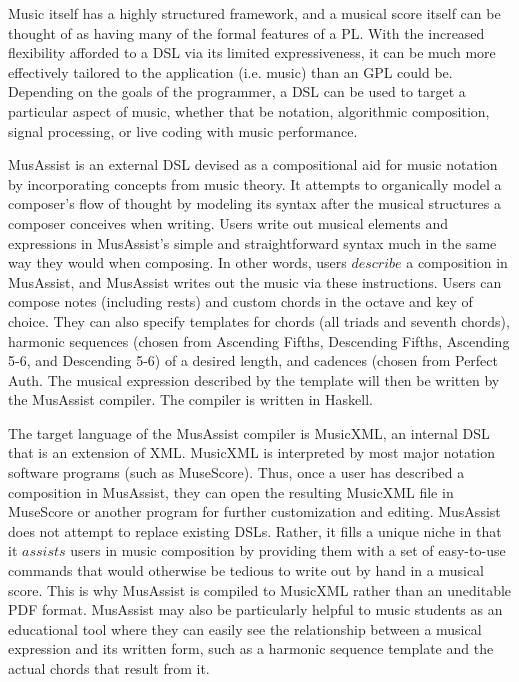 \documentclass{report}
\begin{document}
Music itself has a highly structured framework, and a musical score itself can be thought of as having many of the formal features of a PL. With the increased flexibility afforded to  a DSL via its limited expressiveness, it can be much  more effectively tailored to the application (i.e. music) than an GPL could be. Depending on the goals of the programmer, a DSL can be used to target a particular aspect of music, whether that be notation, algorithmic composition, signal processing, or live coding with music performance. 

MusAssist is an external DSL devised as a compositional aid for music notation by incorporating concepts from music theory. It attempts to organically model a composer's flow of thought by modeling its syntax after the musical structures a composer conceives when writing. Users write out musical elements and expressions in MusAssist's simple and straightforward syntax much in the same way they would when composing. In other words, users $describe$ a composition in MusAssist, and MusAssist writes out the music via these instructions. Users can compose notes (including rests) and custom chords in the octave and key of choice. They can also specify templates for chords (all triads and seventh chords), harmonic sequences (chosen from Ascending Fifths, Descending Fifths, Ascending 5-6, and Descending 5-6) of a desired length, and cadences (chosen from Perfect Auth. The musical expression described by the template will then be written by the MusAssist compiler. The compiler is written in Haskell.

The target language of the MusAssist compiler is MusicXML, an internal DSL that is an extension of XML. MusicXML is interpreted by most major notation software programs (such as MuseScore). Thus, once a user has described a composition in MusAssist, they can open the resulting MusicXML file in MuseScore or another program for further customization and editing. MusAssist does not attempt to replace existing DSLs. Rather, it fills a unique niche in that it $assists$ users in music composition by providing them with a set of easy-to-use commands that would otherwise be tedious to write out by hand in a musical score. This is why MusAssist is compiled to MusicXML rather than an uneditable PDF format. MusAssist may also be particularly helpful to music students as an educational tool where they can easily see the relationship between a musical expression and its written form, such as a harmonic sequence template and the actual chords that result from it.
\end{document}
